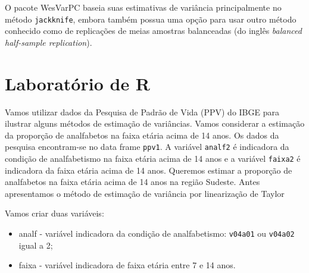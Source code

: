 \documentclass[]{book}
\providecommand{\tightlist}{%
  \setlength{\itemsep}{0pt}\setlength{\parskip}{0pt}}
\numberwithin{example}{chapter}
\numberwithin{remark}{chapter}
\numberwithin{definition}{chapter}
\begin{document}
O pacote WesVarPC \citep{Westat} baseia suas estimativas de variância
principalmente no método \texttt{jackknife}, embora também possua uma
opção para usar outro método conhecido como de replicações de meias
amostras balanceadas (do inglês \emph{balanced half-sample
replication}).

\section{Laboratório de R}\label{laboratorio-de-r}

Vamos utilizar dados da Pesquisa de Padrão de Vida (PPV) do IBGE para
ilustrar alguns métodos de estimação de variâncias. Vamos considerar a
estimação da proporção de analfabetos na faixa etária acima de 14 anos.
Os dados da pesquisa encontram-se no data frame \texttt{ppv1}. A
variável \texttt{analf2} é indicadora da condição de analfabetismo na
faixa etária acima de 14 anos e a variável \texttt{faixa2} é indicadora
da faixa etária acima de 14 anos. Queremos estimar a proporção de
analfabetos na faixa etária acima de 14 anos na região Sudeste. Antes
apresentamos o método de estimação de variância por linearização de
Taylor

Vamos criar duas variáveis:

\begin{itemize}
\tightlist
\item
  analf - variável indicadora da condição de analfabetismo:
  \texttt{v04a01} ou \texttt{v04a02} igual a 2;
\item
  faixa - variável indicadora de faixa etária entre 7 e 14 anos.
\end{itemize}
\end{document}
